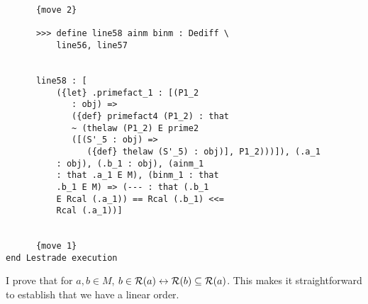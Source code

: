 \documentclass[12pt]{article}
\begin{document}
\begin{verbatim}
      {move 2}

      >>> define line58 ainm binm : Dediff \
          line56, line57


      line58 : [
          ({let} .primefact_1 : [(P1_2 
             : obj) => 
             ({def} primefact4 (P1_2) : that 
             ~ (thelaw (P1_2) E prime2 
             ([(S'_5 : obj) => 
                ({def} thelaw (S'_5) : obj)], P1_2)))]), (.a_1 
          : obj), (.b_1 : obj), (ainm_1 
          : that .a_1 E M), (binm_1 : that 
          .b_1 E M) => (--- : that (.b_1 
          E Rcal (.a_1)) == Rcal (.b_1) <<= 
          Rcal (.a_1))]


      {move 1}
end Lestrade execution
\end{verbatim}

I prove that for $a,b \in M$, $b \in {\cal R}(a) \leftrightarrow {\cal R}(b) \subseteq {\cal R}(a)$.  This makes it straightforward to establish that we have a linear order.
\end{document}
